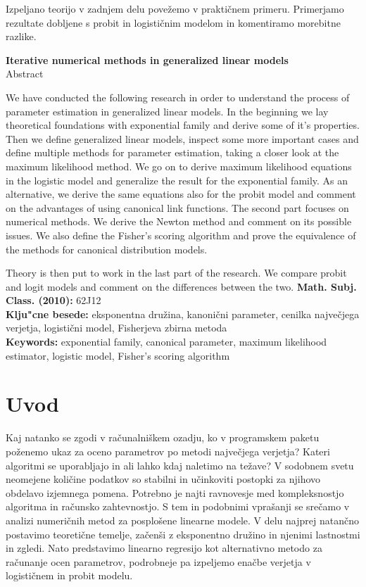 \documentclass[12pt,a4paper]{amsart}
\theoremstyle{definition} %
\theoremstyle{plain} %
\begin{document}
Izpeljano teorijo v zadnjem delu povežemo v praktičnem primeru. Primerjamo rezultate dobljene s probit in logističnim modelom in komentiramo morebitne razlike.
\vfill
\begin{center}
{\bf Iterative numerical methods in generalized linear models}\\[3mm] %
{\sc Abstract}
\end{center}
We have conducted the following research in order to understand the process of parameter estimation in generalized linear models. In the beginning we lay theoretical
foundations with exponential family and derive some of it's properties. Then we define generalized linear models, inspect some more important cases and define multiple
methods for parameter estimation, taking a closer look at the maximum likelihood method. We go on to derive maximum likelihood equations in the logistic model and generalize the 
result for the exponential family. As an alternative, we derive the same equations also for the probit model and comment on the advantages of using canonical link functions.
The second part focuses on numerical methods. We derive the Newton method and comment on its possible issues. We also define the Fisher's scoring algorithm and prove 
the equivalence of the methods for canonical distribution models.

Theory is then put to work in the last part of the research. We compare probit and logit models and comment on the differences between the two.
\vfill\noindent
{\bf Math. Subj. Class. (2010):} 62J12    \\[1mm]
{\bf Klju"cne besede:} eksponentna družina, kanonični parameter, cenilka največjega verjetja, logistični model, Fisherjeva zbirna metoda \\[1mm]
{\bf Keywords:} exponential family, canonical parameter, maximum likelihood estimator, logistic model, Fisher's scoring algorithm
\pagebreak



\section{Uvod}
Kaj natanko se zgodi v računalniškem ozadju, ko v programskem paketu poženemo ukaz za oceno parametrov po metodi največjega verjetja? Kateri algoritmi se uporabljajo in 
ali lahko kdaj naletimo na težave? V sodobnem svetu neomejene količine podatkov so stabilni in učinkoviti postopki za njihovo obdelavo izjemnega pomena. Potrebno je najti
ravnovesje med kompleksnostjo algoritma in računsko zahtevnostjo. S tem in podobnimi vprašanji se srečamo v analizi numeričnih metod za posplošene linearne modele.
V delu najprej natančno postavimo teoretične temelje, začenši z eksponentno družino in njenimi lastnostmi in zgledi. Nato predstavimo linearno regresijo kot alternativno metodo
za računanje ocen parametrov, podrobneje pa izpeljemo enačbe verjetja v logističnem in probit modelu. 
\end{document}
